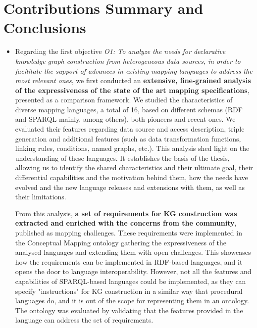 \section{Contributions Summary and Conclusions}
\label{sec:chp7_summary}
\begin{itemize}
    \item Regarding the first objective \textit{O1: To analyze the needs for declarative knowledge graph construction from heterogeneous data sources, in order to facilitate the support of advances in existing mapping languages to address the most relevant ones}, we first conducted an \textbf{extensive, fine-grained analysis of the expressiveness of the state of the art mapping specifications}, presented as a comparison framework. 
    We studied the characteristics of diverse mapping languages, a total of 16, based on different schemas (RDF and SPARQL mainly, among others), both pioneers and recent ones. 
    We evaluated their features regarding data source and access description, triple generation and additional features (such as data transformation functions, linking rules, conditions, named graphs, etc.). 
    This analysis shed light on the understanding of these languages. It establishes the basis of the thesis, allowing us to identify the shared characteristics and their ultimate goal, their differential capabilities and the motivation behind them, how the needs have evolved and the new language releases and extensions with them, as well as their limitations.
    
    From this analysis, \textbf{a set of requirements for KG construction was extracted and enriched with the concerns from the community}, published as mapping challenges. 
    These requirements were implemented in the Conceptual Mapping ontology gathering the expressiveness of the analysed languages and extending them with open challenges. This showcases how the requirements can be implemented in RDF-based languages, and it opens the door to language interoperability. 
    However, not all the features and capabilities of SPARQL-based languages could be implemented, as they can specify "instructions" for KG construction in a similar way that procedural languages do, and it is out of the scope for representing them in an ontology. 
    The ontology was evaluated by validating that the features provided in the language can address the set of requirements. 
    

\end{itemize}
